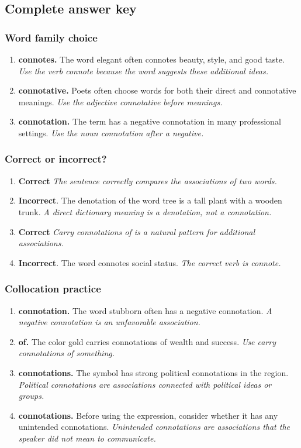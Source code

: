 \documentclass[11pt]{article}
\begin{document}
\subsection{Complete answer key}
\subsubsection{Word family choice}
\begin{enumerate}
  \item \textbf{connotes.} The word elegant often connotes beauty, style, and good taste. \emph{Use the verb connote because the word suggests these additional ideas.}
  \item \textbf{connotative.} Poets often choose words for both their direct and connotative meanings. \emph{Use the adjective connotative before meanings.}
  \item \textbf{connotation.} The term has a negative connotation in many professional settings. \emph{Use the noun connotation after a negative.}
\end{enumerate}

\subsubsection{Correct or incorrect?}
\begin{enumerate}
  \item \textbf{Correct} \emph{The sentence correctly compares the associations of two words.}
  \item \textbf{Incorrect}. The denotation of the word tree is a tall plant with a wooden trunk. \emph{A direct dictionary meaning is a denotation, not a connotation.}
  \item \textbf{Correct} \emph{Carry connotations of is a natural pattern for additional associations.}
  \item \textbf{Incorrect}. The word connotes social status. \emph{The correct verb is connote.}
\end{enumerate}

\subsubsection{Collocation practice}
\begin{enumerate}
  \item \textbf{connotation.} The word stubborn often has a negative connotation. \emph{A negative connotation is an unfavorable association.}
  \item \textbf{of.} The color gold carries connotations of wealth and success. \emph{Use carry connotations of something.}
  \item \textbf{connotations.} The symbol has strong political connotations in the region. \emph{Political connotations are associations connected with political ideas or groups.}
  \item \textbf{connotations.} Before using the expression, consider whether it has any unintended connotations. \emph{Unintended connotations are associations that the speaker did not mean to communicate.}
\end{enumerate}
\end{document}
